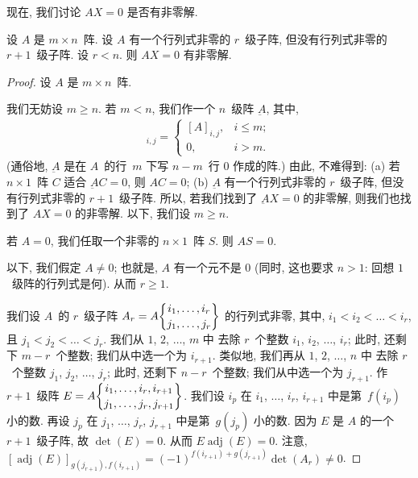 \documentclass[../libro.tex]{subfiles}
\begin{document}
现在, 我们讨论 \(AX = 0\) 是否有非零解.

\begin{theorem}
    设 \(A\) 是 \(m \times n\)~阵.
    设 \(A\) 有一个行列式非零的 \(r\)~级子阵,
    但没有行列式非零的 \(r+1\)~级子阵.
    设 \(r < n\).
    则 \(AX = 0\) 有非零解.
\end{theorem}

\begin{proof}
    设 \(A\) 是 \(m \times n\)~阵.

    我们无妨设 \(m \geq n\).
    若 \(m < n\), 我们作一个 \(n\)~级阵 \(\underbar{A}\),
    其中,
    \begin{align*}
        [\underbar{A}]_{i,j} =
        \begin{cases}
            [A]_{i,j}, & i \leq m; \\
            0,         & i > m.
        \end{cases}
    \end{align*}
    (通俗地, \(\underbar{A}\)
    是在 \(A\)~的行~\(m\) 下写 \(n-m\)~行 \(0\) 作成的阵.)
    由此, 不难得到:
    (a)
    若 \(n \times 1\)~阵 \(C\) 适合 \(\underbar{A}C = 0\),
    则 \(AC = 0\);
    (b)
    \(\underbar{A}\) 有一个行列式非零的 \(r\)~级子阵,
    但没有行列式非零的 \(r+1\)~级子阵.
    所以, 若我们找到了 \(\underbar{A}X = 0\)
    的非零解,
    则我们也找到了 \(AX = 0\) 的非零解.
    以下, 我们设 \(m \geq n\).

    若 \(A = 0\),
    我们任取一个非零的 \(n \times 1\)~阵 \(S\).
    则 \(AS = 0\).

    以下, 我们假定 \(A \neq 0\);
    也就是, \(A\) 有一个元不是 \(0\)
    (同时, 这也要求 \(n > 1\):
    回想 \(1\)~级阵的行列式是何).
    从而 \(r \geq 1\).

    我们设 \(A\)~的 \(r\)~级子阵
    \(A_r = A\submat{i_1,\dots,i_r}{j_1,\dots,j_r}\)
    的行列式非零,
    其中, \(i_1 < i_2 < \dots < i_r\),
    且 \(j_1 < j_2 < \dots < j_r\).
    我们从 \(1\), \(2\), \(\dots\), \(m\) 中%
    去除 \(r\)~个整数
    \(i_1\), \(i_2\), \(\dots\), \(i_r\);
    此时, 还剩下 \(m-r\)~个整数;
    我们从中选一个为 \(i_{r+1}\).
    类似地,
    我们再从 \(1\), \(2\), \(\dots\), \(n\) 中%
    去除 \(r\)~个整数
    \(j_1\), \(j_2\), \(\dots\), \(j_r\);
    此时, 还剩下 \(n-r\)~个整数;
    我们从中选一个为 \(j_{r+1}\).
    作 \(r+1\)~级阵
    \(
        E =
        A\submat{i_1,\dots,i_r,i_{r+1}}
        {j_1,\dots,j_r,j_{r+1}}
    \).
    我们设 \(i_p\) 在
    \(i_1\), \(\dots\), \(i_r\), \(i_{r+1}\)
    中是第~\(f(i_p)\) 小的数.
    再设 \(j_p\) 在
    \(j_1\), \(\dots\), \(j_r\), \(j_{r+1}\)
    中是第~\(g(j_p)\) 小的数.
    因为 \(E\) 是 \(A\) 的一个 \(r+1\)~级子阵,
    故 \(\det {(E)} = 0\).
    从而
    \(E \operatorname{adj} {(E)} = 0\).
    注意,
    \([\operatorname{adj} {(E)}]_{g(j_{r+1}), f(i_{r+1})}
    = (-1)^{f(i_{r+1})+g(j_{r+1})} \det {(A_r)} \neq 0\).


\end{proof}
\end{document}
